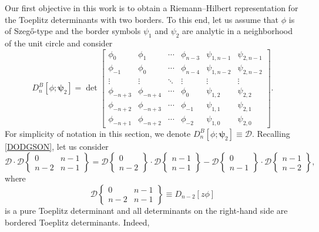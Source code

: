 \documentclass[10pt,a4paper]{amsart}
\numberwithin{equation}{section}
\begin{document}
	
	Our first objective in this work is to obtain a Riemann--Hilbert representation for the Toeplitz determinants with two borders. To this end, let us assume that $\phi$ is of Szeg\H{o}-type and the border symbols $\psi_1$ and $\psi_2$ are analytic in a neighborhood of the unit circle and consider
	\begin{equation*}
		D^B_n[\phi;\boldsymbol{\psi}_2] = \det \begin{bmatrix}
			\phi_0& \phi_{1} & \cdots & \phi_{n-3} & \psi_{1,n-1} & \psi_{2,n-1} \\
			\phi_{-1}& \phi_0 & \cdots & \phi_{n-4} & \psi_{1,n-2} & \psi_{2,n-2} \\
			\vdots & \vdots & \ddots & \vdots & \vdots & \vdots \\
			\phi_{-n+3} & \phi_{-n+4} & \cdots & \phi_{0} & \psi_{1,2} & \psi_{2,2}\\
			\phi_{-n+2} & \phi_{-n+3} & \cdots & \phi_{-1} & \psi_{1,1} & \psi_{2,1} \\
			\phi_{-n+1} & \phi_{-n+2} & \cdots & \phi_{-2} & \psi_{1,0} & \psi_{2,0}
		\end{bmatrix}.
	\end{equation*}
	For simplicity of notation in this section, we denote $D^B_n[\phi;\boldsymbol{\psi}_2] \equiv \mathscr{D}$.
	Recalling \eqref{DODGSON}, let us consider
	\begin{equation}\label{DODGSON3}
		\mathscr{D} \cdot \mathscr{D}\left\lbrace \begin{matrix} 0 & n-1 \\ n-2& n-1 \end{matrix} \right\rbrace = \mathscr{D}\left\lbrace \begin{matrix} 0 \\ n-2 \end{matrix} \right\rbrace \cdot \mathscr{D}\left\lbrace \begin{matrix} n-1 \\ n-1 \end{matrix} \right\rbrace - \mathscr{D}\left\lbrace \begin{matrix} 0 \\ n-1 \end{matrix} \right\rbrace \cdot \mathscr{D}\left\lbrace \begin{matrix} n-1 \\ n-2 \end{matrix} \right\rbrace,
	\end{equation}
	where
\begin{equation*}\label{zphi}
		\mathscr{D}\left\lbrace \begin{matrix} 0 & n-1 \\ n-2& n-1 \end{matrix} \right\rbrace \equiv D_{n-2}[z \phi]
	\end{equation*} is a pure Toeplitz determinant and all determinants on the right-hand side are bordered Toeplitz determinants. Indeed,
\end{document}
